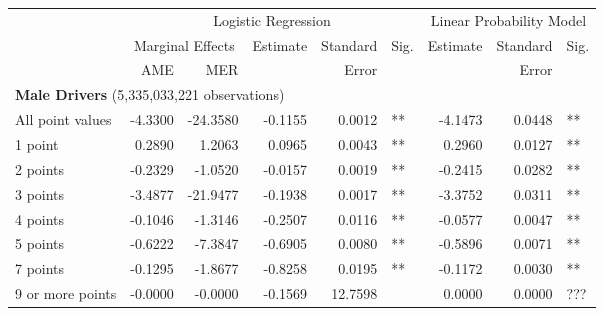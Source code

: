
\begin{table}%
\centering 
\begin{tabular}{l r r r r l r r l} 

\hline 
 
 & \multicolumn{5}{c}{Logistic Regression}  & \multicolumn{3}{c}{Linear Probability Model} \\ 

 \cmidrule(lr){2-6}\cmidrule(lr){7-9} 
 & \multicolumn{2}{c}{Marginal Effects} & Estimate & Standard & Sig. & Estimate & Standard & Sig. \\ 

 \cmidrule(lr){2-3} 
 &   AME & MER &          &  Error   &      &          &  Error   &     \\ 

\hline 
 
\multicolumn{8}{l}{\textbf{Male Drivers} (5,335,033,221 observations)} \\ 

All point values                &  -4.3300        &  -24.3580       &  -0.1155        &  0.0012       &   **       &  -4.1473        &  0.0448       &   **       \\ 
1 point                         &  0.2890        &  1.2063       &  0.0965        &  0.0043       &   **       &  0.2960        &  0.0127       &   **       \\ 
2 points                        &  -0.2329        &  -1.0520       &  -0.0157        &  0.0019       &   **       &  -0.2415        &  0.0282       &   **       \\ 
3 points                        &  -3.4877        &  -21.9477       &  -0.1938        &  0.0017       &   **       &  -3.3752        &  0.0311       &   **       \\ 
4 points                        &  -0.1046        &  -1.3146       &  -0.2507        &  0.0116       &   **       &  -0.0577        &  0.0047       &   **       \\ 
5 points                        &  -0.6222        &  -7.3847       &  -0.6905        &  0.0080       &   **       &  -0.5896        &  0.0071       &   **       \\ 
7 points                        &  -0.1295        &  -1.8677       &  -0.8258        &  0.0195       &   **       &  -0.1172        &  0.0030       &   **       \\ 
9 or more points                &  -0.0000        &  -0.0000       &  -0.1569        &  12.7598       &            &  0.0000        &  0.0000       &  ???       \\ 


\end{tabular}
\end{table}
